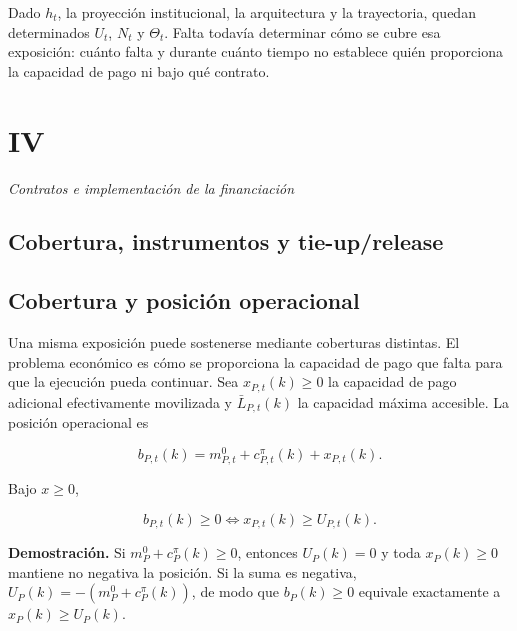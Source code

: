 \documentclass[10pt,a5paper,twoside]{article}
\begin{document}
Dado \(h_t\), la proyección institucional, la arquitectura y la trayectoria,
quedan determinados \(U_t\), \(N_t\) y \(\Theta_t\). Falta todavía determinar
cómo se cubre esa exposición: cuánto falta y durante cuánto tiempo no
establece quién proporciona la capacidad de pago ni bajo qué contrato.


\cleardoublepage
\setcounter{subsection}{0}
\vspace*{6mm}\section*{IV}\label{iv.-contratos-e-implementaciuxf3n-de-la-financiaciuxf3n}
\thispagestyle{plain}
{\large\itshape Contratos e implementación de la financiación\par}\vspace{1.2ex}

\subsection*{Cobertura, instrumentos y tie-up/release}\label{cobertura-instrumentos-y-tie-uprelease}

\subsection{Cobertura y posición operacional}\label{cobertura-y-posiciuxf3n-operacional}

Una misma exposición puede sostenerse mediante coberturas distintas. El problema
económico es cómo se proporciona la capacidad de pago que falta para que la ejecución
pueda continuar. Sea \(x_{P,t}(k)\ge0\) la capacidad de pago adicional efectivamente
movilizada y \(\bar L_{P,t}(k)\) la capacidad máxima accesible. La posición
operacional es

\[
b_{P,t}(k)
=
m^0_{P,t}
+
c^\pi_{P,t}(k)
+
x_{P,t}(k).
\]

Bajo \(x\ge0\),

\[
b_{P,t}(k)\ge0
\iff
x_{P,t}(k)\ge U_{P,t}(k).
\]

\textbf{Demostración.} Si \(m^0_P+c^\pi_P(k)\ge0\), entonces
\(U_P(k)=0\) y toda \(x_P(k)\ge0\) mantiene no negativa la posición. Si
la suma es negativa, \(U_P(k)=-(m^0_P+c^\pi_P(k))\), de modo que
\(b_P(k)\ge0\) equivale exactamente a \(x_P(k)\ge U_P(k)\).
\end{document}
